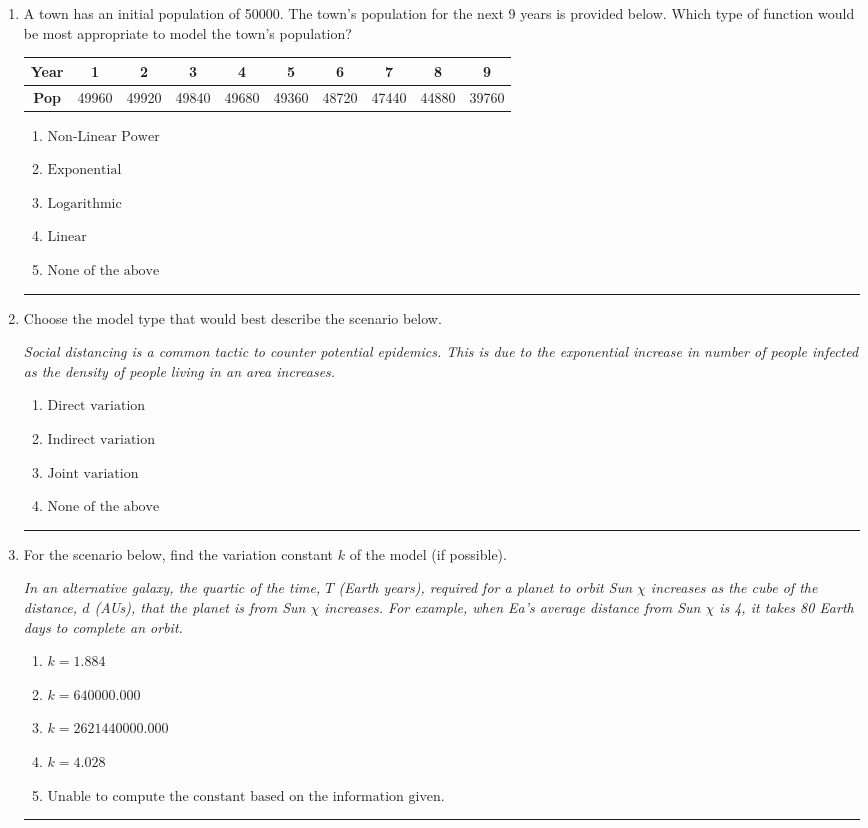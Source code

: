 \documentclass[14pt]{extbook}
\newcommand{\litem}[1]{\item#1\hspace*{-1cm}\rule{\textwidth}{0.4pt}}
\begin{document}
\begin{enumerate}
{\begin{enumerate}[label=\Alph*.]
\end{enumerate} }
\litem{
A town has an initial population of 50000. The town's population for the next 9 years is provided below. Which type of function would be most appropriate to model the town's population?

\begin{tabular}{c|c|c|c|c|c|c|c|c|c}
\textbf{Year} &1 &2 &3 &4 &5 &6 &7 &8 &9\tabularnewline \hline
\textbf{Pop} &49960 &49920 &49840 &49680 &49360 &48720 &47440 &44880 &39760\end{tabular}\begin{enumerate}[label=\Alph*.]
\item \( \text{Non-Linear Power} \)
\item \( \text{Exponential} \)
\item \( \text{Logarithmic} \)
\item \( \text{Linear} \)
\item \( \text{None of the above} \)

\end{enumerate} }
\litem{
Choose the model type that would best describe the scenario below.
\begin{center}
    \textit{ Social distancing is a common tactic to counter potential epidemics. This is due to the exponential increase in number of people infected as the density of people living in an area increases. }
\end{center}
\begin{enumerate}[label=\Alph*.]
\item \( \text{Direct variation} \)
\item \( \text{Indirect variation} \)
\item \( \text{Joint variation} \)
\item \( \text{None of the above} \)

\end{enumerate} }
\litem{
For the scenario below, find the variation constant $k$ of the model (if possible).
\begin{center}
    \textit{ In an alternative galaxy, the quartic of the time, $T$ (Earth years), required for a planet to orbit Sun $\chi$ increases as the cube of the distance, $d$ (AUs), that the planet is from Sun $\chi$ increases. For example, when Ea's average distance from Sun $\chi$ is 4, it takes 80 Earth days to complete an orbit. }
\end{center}
\begin{enumerate}[label=\Alph*.]
\item \( k = 1.884 \)
\item \( k = 640000.000 \)
\item \( k = 2621440000.000 \)
\item \( k = 4.028 \)
\item \( \text{Unable to compute the constant based on the information given.} \)


\end{enumerate}}
\end{enumerate}
\end{document}
